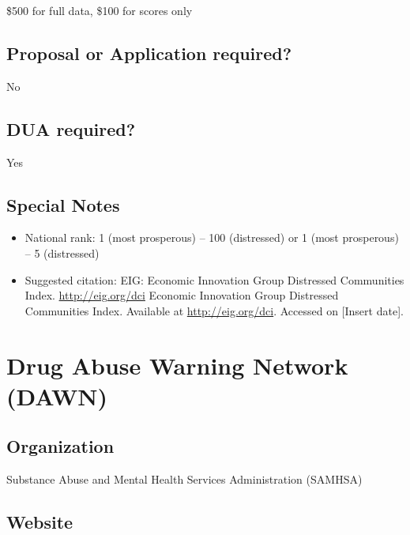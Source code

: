 \documentclass[
]{book}
\providecommand{\tightlist}{%
  \setlength{\itemsep}{0pt}\setlength{\parskip}{0pt}}
\begin{document}
\$500 for full data, \$100 for scores only

\hypertarget{proposal-or-application-required-22}{%
\section{Proposal or Application required?}\label{proposal-or-application-required-22}}

No

\hypertarget{dua-required-22}{%
\section{DUA required?}\label{dua-required-22}}

Yes

\hypertarget{special-notes-22}{%
\section{Special Notes}\label{special-notes-22}}

\begin{itemize}
\tightlist
\item
  National rank: 1 (most prosperous) -- 100 (distressed) or 1 (most prosperous) -- 5 (distressed)
\item
  Suggested citation: EIG: Economic Innovation Group Distressed Communities Index. \url{http://eig.org/dci} Economic Innovation Group Distressed Communities Index. Available at \url{http://eig.org/dci}. Accessed on {[}Insert date{]}.
\end{itemize}

\mainmatter

\hypertarget{drug-abuse-warning-network-dawn}{%
\chapter{Drug Abuse Warning Network (DAWN)}\label{drug-abuse-warning-network-dawn}}

\hypertarget{organization-23}{%
\section{Organization}\label{organization-23}}

Substance Abuse and Mental Health Services Administration (SAMHSA)

\hypertarget{website-23}{%
\section{Website}\label{website-23}}
\end{document}
